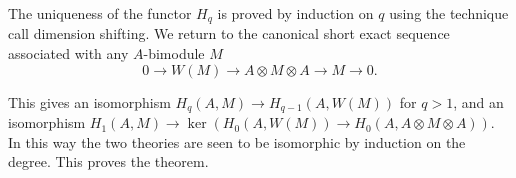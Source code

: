 The uniqueness of the functor $H_{q}$ is proved by induction on $q$
using the technique call dimension shifting. We return to the
canonical short exact sequence associated with any $A$-bimodule $M$
$$
0\to W(M)\to A\otimes M\otimes A\to M\to 0.
$$

This gives an isomorphism $H_{q}(A,M)\to H_{q-1}(A,W(M))$ for $q>1$,
and an isomorphism $H_{1}(A,M)\to \ker(H_{0}(A,W(M))\to
H_{0}(A,A\otimes M\otimes A))$. In this way the two theories are seen
to be isomorphic by induction on the degree. This proves the theorem. 



